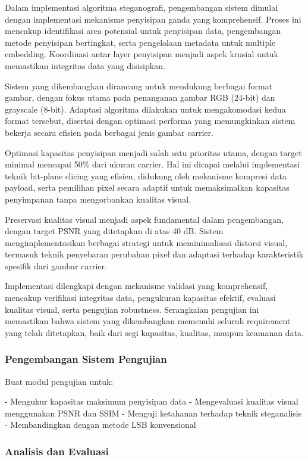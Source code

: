 \documentclass{ittelkom}
\begin{document}
Dalam implementasi algoritma steganografi, pengembangan sistem dimulai dengan
implementasi mekanisme penyisipan ganda yang komprehensif. Proses ini mencakup
identifikasi area potensial untuk penyisipan data, pengembangan metode
penyisipan bertingkat, serta pengelolaan metadata untuk multiple embedding.
Koordinasi antar layer penyisipan menjadi aspek krusial untuk memastikan
integritas data yang disisipkan.

Sistem yang dikembangkan dirancang untuk mendukung berbagai format gambar,
dengan fokus utama pada penanganan gambar RGB (24-bit) dan grayscale (8-bit).
Adaptasi algoritma dilakukan untuk mengakomodasi kedua format tersebut,
disertai dengan optimasi performa yang memungkinkan sistem bekerja secara
efisien pada berbagai jenis gambar carrier.

Optimasi kapasitas penyisipan menjadi salah satu prioritas utama, dengan target
minimal mencapai 50\% dari ukuran carrier. Hal ini dicapai melalui implementasi
teknik bit-plane slicing yang efisien, didukung oleh mekanisme kompresi data
payload, serta pemilihan pixel secara adaptif untuk memaksimalkan kapasitas
penyimpanan tanpa mengorbankan kualitas visual.

Preservasi kualitas visual menjadi aspek fundamental dalam pengembangan, dengan
target PSNR yang ditetapkan di atas 40 dB. Sistem mengimplementasikan berbagai
strategi untuk meminimalisasi distorsi visual, termasuk teknik penyebaran
perubahan pixel dan adaptasi terhadap karakteristik spesifik dari gambar
carrier.

Implementasi dilengkapi dengan mekanisme validasi yang komprehensif, mencakup
verifikasi integritas data, pengukuran kapasitas efektif, evaluasi kualitas
visual, serta pengujian robustness. Serangkaian pengujian ini memastikan bahwa
sistem yang dikembangkan memenuhi seluruh requirement yang telah ditetapkan,
baik dari segi kapasitas, kualitas, maupun keamanan data.

\subsubsection{Pengembangan Sistem Pengujian}

Buat modul pengujian untuk:

- Mengukur kapasitas maksimum penyisipan data
- Mengevaluasi kualitas visual menggunakan PSNR dan SSIM
- Menguji ketahanan terhadap teknik steganalisis
- Membandingkan dengan metode LSB konvensional

\subsubsection{Analisis dan Evaluasi}
\end{document}
